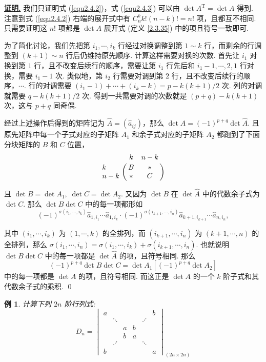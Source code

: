 \documentclass[10pt,openany]{article}
\theoremstyle{thmstyle} %
\theoremstyle{defstyle} %
\theoremstyle{prostyle} %
\theoremstyle{exastyle}
\newtheorem{example}[theorem]{例}
\theoremstyle{remstyle}
\renewenvironment{proof}[1][证明]{\par\underline{\textbf{#1.}} \;\fangsong}{\qed\par}
\newcommand{\T}{^{\text{T}}}
\begin{document}
\begin{proof}
	我们只证明式 (\ref{equ2.4.2})，式 (\ref{equ2.4.3}) 可以由 \( \det A\T= \det A \) 得到. 注意到式 (\ref{equ2.4.2}) 右端的展开式中有 \( C_n^k k! (n-k)!=n! \) 项，且都互不相同. 只需要证明这 \( n! \) 项都是 \( \det A \) 展开式 (定义 \ref{2.3.35}) 中的项且符号一致即可.
	
	为了简化讨论，我们先把第 \( i_1,\cdots,i_k \) 行经过对换调整到第 \( 1 \sim k \) 行，而剩余的行调整到 \( (k+1) \sim n \) 行后仍维持原先顺序. 计算这样需要对换的次数. 首先让 \( i_1 \) 对换到第 \( 1 \) 行，且不改变后续行的顺序，需要让第 \( i_1 \) 行先后和 \( i_1-1,\cdots,2,1 \) 行对换，需要 \( i_1-1 \) 次. 类似地，第 \( i_2 \) 行需要对调到第 \( 2 \) 行，且不改变后续行的顺序，\( \cdots \). 行的对调需要 \( (i_1-1)+\cdots+(i_k-k)=p-k(k+1)/2 \) 次. 列的对调就需要 \( q-k(k+1)/2 \) 次. 得到一共需要对调的次数就是 \( (p+q)-k(k+1) \) 次，这与 \( p+q \) 同奇偶.
	
	经过上述操作后得到的矩阵记为 \( \hat{A}=(\hat{a}_{ij}) \)，那么 \( \det A= (-1)^{p+q} \det \hat{A} \). 且原先矩阵中每一个子式对应的子矩阵 \( A_1 \) 和余子式对应的子矩阵 \( A_2 \) 都跑到了下面分块矩阵的 \( B \) 和 \( C \) 位置，
	\[ \bordermatrix{
		& k & n-k \cr
		k & B & * \cr
		n-k & * & C
	} \]
	
	且 \( \det B=\det A_1, \; \det C=\det A_2 \). 又因为 \( \det B \) 在 \( \det \hat{A} \) 中的代数余子式为 \( \det C \). 那么 \( \det B \det C \) 中的每一项都形如
	\[ (-1)^{\sigma(i_1,\cdots,i_k)}\hat{a}_{1,i_1}\cdots \hat{a}_{1,i_k} \cdot (-1)^{\sigma(i_{k+1},\cdots,i_n)} \hat{a}_{k+1,i_{k+1}}\cdots \hat{a}_{n,i_n},  \]
	
	其中 \( (i_1,\cdots,i_k) \) 为 \( (1,\cdots,k) \) 的全排列，而 \( (i_{k+1},\cdots,i_n) \) 为 \( (k+1,\cdots,n) \) 的全排列，那么 \( \sigma(i_1,\cdots,i_n)=\sigma(i_1,\cdots,i_k)+\sigma(i_{k+1},\cdots,i_n) \). 也就说明 \( \det B \det C  \) 中的每一项都是 \( \det \hat{A} \) 的项，且符号相同. 那么
	\[ (-1)^{p+q}\det B \det C=\det A_1 [(-1)^{p+q} \det A_2] \] 
	中的每一项都是 \( \det A \) 的项，且符号相同. 而这正是 \( \det A \) 的一个 \( k \) 阶子式和其代数余子式的乘积.
\end{proof}

\begin{example}
	计算下列 \( 2n \) 阶行列式:
	\[
	D_n=\begin{vmatrix}
		a &        &        &        &  & b \\
		& \ddots &        &  & \iddots &   \\
		&        & a      & b   &     &   \\
		&  & b      & a   &     &   \\
		& \iddots&      &   & \ddots     &   \\
		b &        &        &       & & a
	\end{vmatrix}_{(2n \times 2n)}
	\]
\end{example}
\end{document}

